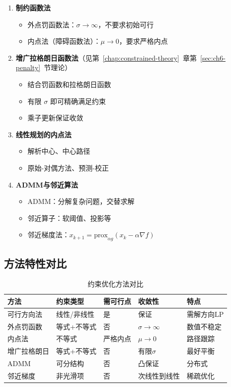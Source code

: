 \begin{conceptbox}
\begin{enumerate}[label=\arabic*., leftmargin=2em]
    \item \textbf{制约函数法}
    \begin{itemize}
        \item 外点罚函数法：$\sigma \to \infty$，不要求初始可行
        \item 内点法（障碍函数法）：$\mu \to 0$，要求严格内点
    \end{itemize}
    \item \textbf{增广拉格朗日函数法}（见第~\ref{chap:constrained-theory}~章第~\ref{sec:ch6-penalty}~节理论）
    \begin{itemize}
        \item 结合罚函数和拉格朗日函数
        \item 有限 $\sigma$ 即可精确满足约束
        \item 乘子更新保证收敛
    \end{itemize}
    \item \textbf{线性规划的内点法}
    \begin{itemize}
        \item 解析中心、中心路径
        \item 原始-对偶方法、预测-校正
    \end{itemize}
    \item \textbf{ADMM与邻近算法}
    \begin{itemize}
        \item ADMM：分解复杂问题，交替求解
        \item 邻近算子：软阈值、投影等
        \item 邻近梯度法：$x_{k+1} = \text{prox}_{\alpha g}(x_k - \alpha \nabla f)$
    \end{itemize}
\end{enumerate}
\end{conceptbox}

\subsection{方法特性对比}

\begin{table}[htbp]
\centering
\caption{约束优化方法对比}
\begin{tabular}{@{}lllll@{}}
\toprule
\textbf{方法} & \textbf{约束类型} & \textbf{需可行点} & \textbf{收敛性} & \textbf{特点} \\
\midrule
可行方向法 & 线性/非线性 & 是 & 保证 & 需解方向LP \\
外点罚函数 & 等式+不等式 & 否 & $\sigma\to\infty$ & 数值不稳定 \\
内点法 & 不等式 & 严格内点 & $\mu\to 0$ & 路径跟踪 \\
增广拉格朗日 & 等式+不等式 & 否 & 有限$\sigma$ & 最好平衡 \\
ADMM & 可分结构 & 否 & 凸保证 & 分布式 \\
邻近梯度 & 非光滑项 & 否 & 次线性到线性 & 稀疏优化 \\
\bottomrule
\end{tabular}
\end{table}

